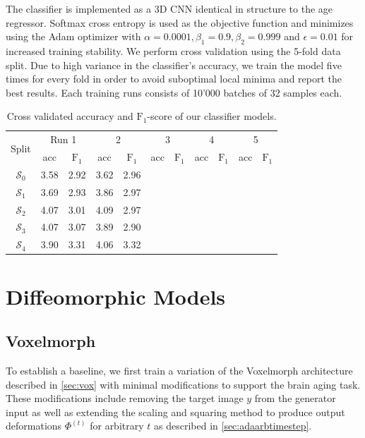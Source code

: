 The classifier is implemented as a 3D CNN identical in structure to the age regressor. Softmax cross entropy is used as the objective function and minimizes using the Adam optimizer with $\alpha = 0.0001, \beta_1 = 0.9, \beta_2 = 0.999$ and $\epsilon = 0.01$ for increased training stability.
We perform cross validation using the 5-fold data split. Due to high variance in the classifier's accuracy, we train the model five times for every fold in order to avoid suboptimal local minima and report the best results. Each training runs consists of 10'000 batches of 32 samples each.

\begin{table}[h]
	\begin{center}
		\begin{tabular}{c c c c c c c c c c c}
			\toprule
			\multirow{2}{*}{Split} & 
			\multicolumn{2}{c}{Run 1} & 
			\multicolumn{2}{c}{2} & 
			\multicolumn{2}{c}{3} & 
			\multicolumn{2}{c}{4} & 
			\multicolumn{2}{c}{5} \\
			\cmidrule(lr){2-3}
			\cmidrule(lr){4-5}
			\cmidrule(lr){6-7}
			\cmidrule(lr){8-9}
			\cmidrule(lr){10-11}
			 & acc & $\text{F}_1$ & acc & $\text{F}_1$ & acc & $\text{F}_1$ & acc & $\text{F}_1$ & acc & $\text{F}_1$ \\ 
			\cmidrule(lr){1-11}
			$\mathcal{S}_0$ & 3.58 & 2.92 & 3.62 & 2.96 & & & & & & \\
			$\mathcal{S}_1$ & 3.69 & 2.93 & 3.86 & 2.97 & & & & & & \\
			$\mathcal{S}_2$ & 4.07 & 3.01 & 4.09 & 2.97 & & & & & & \\
			$\mathcal{S}_3$ & 4.07 & 3.07 & 3.89 & 2.90 & & & & & & \\
			$\mathcal{S}_4$ & 3.90 & 3.31 & 4.06 & 3.32 & & & & & & \\
			\bottomrule
		\end{tabular}
		\caption{Cross validated accuracy and $\text{F}_1$-score of our classifier models.}
		\label{tab:clfcrossval}
	\end{center}
\end{table}

\section{Diffeomorphic Models}

\subsection{Voxelmorph}
To establish a baseline, we first train a variation of the Voxelmorph architecture described in \autoref{sec:vox} with minimal modifications to support the brain aging task. These modifications include removing the target image $y$ from the generator input as well as extending the scaling and squaring method to produce output deformations $\Phi^{(t)}$ for arbitrary $t$ as described in \autoref{sec:adaarbtimestep}.

